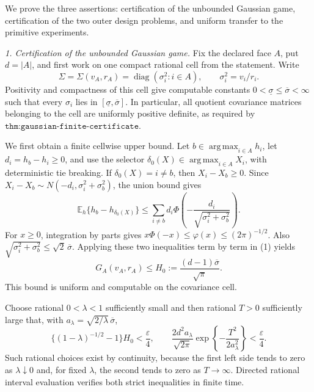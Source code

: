 We prove the three assertions: certification of the unbounded Gaussian game, certification of the two outer design problems, and uniform transfer to the primitive experiments.

\emph{1. Certification of the unbounded Gaussian game.}
Fix the declared face \(A\), put \(d=|A|\), and first work on one compact rational cell from the statement.  Write
\[
 \Sigma=\Sigma(v_A,r_A)=\operatorname{diag}(\sigma_i^2:i\in A),
 \qquad \sigma_i^2=v_i/r_i.
\]
Positivity and compactness of this cell give computable constants \(0<\underline\sigma\leq\overline\sigma<\infty\) such that every \(\sigma_i\) lies in \([\underline\sigma,\overline\sigma]\).  In particular, all quotient covariance matrices belonging to the cell are uniformly positive definite, as required by \(\texttt{thm:gaussian-finite-certificate}\).

We first obtain a finite cellwise upper bound.  Let \(b\in\operatorname*{arg\,max}_{i\in A}h_i\), let \(d_i=h_b-h_i\geq0\), and use the selector \(\delta_0(X)\in\operatorname*{arg\,max}_{i\in A}X_i\), with deterministic tie breaking.  If \(\delta_0(X)=i\ne b\), then \(X_i-X_b\geq0\).  Since \(X_i-X_b\sim N(-d_i,\sigma_i^2+\sigma_b^2)\), the union bound gives
\[
 \mathbb E_h\{h_b-h_{\delta_0(X)}\}
 \leq \sum_{i\ne b}d_i\Phi\!\left(-\frac{d_i}{\sqrt{\sigma_i^2+\sigma_b^2}}\right).
\tag{1}
\]
For \(x\geq0\), integration by parts gives \(x\Phi(-x)\leq\varphi(x)\leq(2\pi)^{-1/2}\).  Also \(\sqrt{\sigma_i^2+\sigma_b^2}\leq\sqrt2\,\overline\sigma\).  Applying these two inequalities term by term in (1) yields
\[
 G_A(v_A,r_A)\leq H_0:=\frac{(d-1)\overline\sigma}{\sqrt\pi}.
\tag{2}
\]
This bound is uniform and computable on the covariance cell.

Choose rational \(0<\lambda<1\) sufficiently small and then rational \(T>0\) sufficiently large that, with \(a_\lambda=\sqrt{2/\lambda}\,\overline\sigma\),
\[
 \{(1-\lambda)^{-1/2}-1\}H_0<\frac{\varepsilon}{4},
 \qquad
 \frac{2d^2a_\lambda}{\sqrt{2\pi}}
       \exp\!\left\{-\frac{T^2}{2a_\lambda^2}\right\}<\frac{\varepsilon}{4}.
\tag{3}
\]
Such rational choices exist by continuity, because the first left side tends to zero as \(\lambda\downarrow0\) and, for fixed \(\lambda\), the second tends to zero as \(T\to\infty\).  Directed rational interval evaluation verifies both strict inequalities in finite time.

